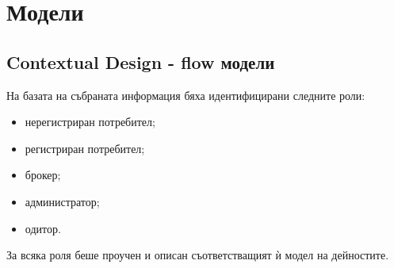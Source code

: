 \documentclass[]{article}
\begin{document}
\section{Модели}

\subsection*{Contextual Design - flow модели}
На базата на събраната информация бяха идентифицирани следните роли:
\begin{itemize}
	\item нерегистриран потребител;
	\item регистриран потребител;
	\item брокер;
	\item администратор;
	\item одитор.
\end{itemize}
За всяка роля беше проучен и описан съответстващият ѝ модел на дейностите.
\end{document}
